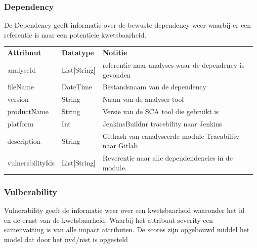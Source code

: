 \subsubsection{Dependency}\label{subsubsec:dependency}
De Dependency geeft informatie over de bewuste dependency weer waarbij er een referentie is naar een potentiele kwetsbaarheid.

\begin{tabular}{lll}
    \textbf{Attribuut} & \textbf{Datatype} & \textbf{Notitie}\\
    analyseId & List[String] & referentie naar analyses waar de dependency is gevonden\\
    fileName & DateTime & Bestandsnaam van de dependency\\
    version & String & Naam van de analyser tool\\
    productName & String & Versie van de SCA tool die gebruikt is\\
    platform & Int & JenkinsBuildnr tracebility naar Jenkins\\
    description & String & Githash van  eanalyseerde module Tracability naar Gitlab\\
    vulnerabilityIds & List[String] & Reverentie naar alle dependendencies in de module.\\
\end{tabular}

\subsubsection{Vulberability}\label{subsubsec:vulberability}
Vulnerability geeft de informatie weer over een kwetsbaarheid waaronder het id en de ernst van de kwetsbaarheid. Waarbij het attribuut severity een samenvatting is van alle impact attributen.  De scores zijn opgebouwd middel het model dat door het nvd/nist is opgesteld

